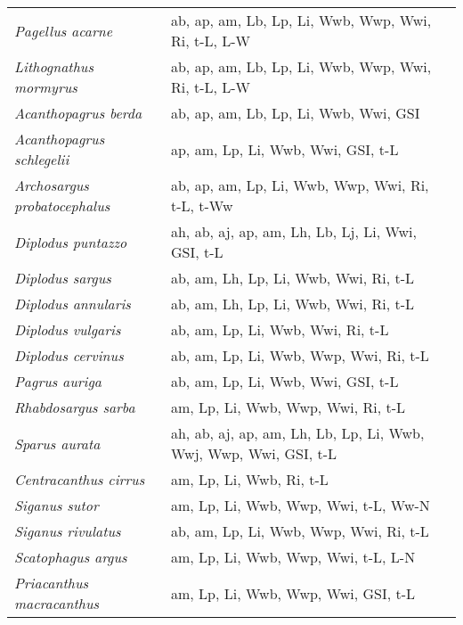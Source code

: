 {\begin{longtable}[c]{p{3.5cm}p{5.5cm}p{5.5cm}}
\emph{Pagellus acarne} &  ab, ap, am, Lb, Lp, Li, Wwb, Wwp, Wwi, Ri, t-L, L-W & \citet{Gaet1935,Bouf2016} \\
\emph{Lithognathus mormyrus} &  ab, ap, am, Lb, Lp, Li, Wwb, Wwp, Wwi, Ri, t-L, L-W & \citet{DivaKent1983,Bouf2016} \\
\emph{Acanthopagrus berda} &  ab, ap, am, Lb, Lp, Li, Wwb, Wwi, GSI & \citet{Garr1993,SheaMolo1999,MathSamu1991,SmitSmit1986,Conn1996,Papa2013} \\
\emph{Acanthopagrus schlegelii} &  ap, am, Lp, Li, Wwb, Wwi, GSI, t-L & \citet{LawSado2018} \\
\emph{Archosargus probatocephalus} &  ab, ap, am, Lp, Li, Wwb, Wwp, Wwi, Ri, t-L, t-Ww & \citet{BeckStan1991} \\
\emph{Diplodus puntazzo} &  ah, ab, aj, ap, am, Lh, Lb, Lj, Li, Wwi, GSI, t-L & \citet{PapaKent2004,LikaKooy2014,Papa2013} \\
\emph{Diplodus sargus} &  ab, am, Lh, Lp, Li, Wwb, Wwi, Ri, t-L & \citet{GordMoli1997} \\
\emph{Diplodus annularis} &  ab, am, Lh, Lp, Li, Wwb, Wwi, Ri, t-L & \citet{GordMoli1997} \\
\emph{Diplodus vulgaris} &  ab, am, Lp, Li, Wwb, Wwi, Ri, t-L & \citet{GordMoli1997} \\
\emph{Diplodus cervinus} &  ab, am, Lp, Li, Wwb, Wwp, Wwi, Ri, t-L & \citet{PajuLore2003} \\
\emph{Pagrus auriga} &  ab, am, Lp, Li, Wwb, Wwi, GSI, t-L & \citet{PajuMart2006,PajuSoco2006} \\
\emph{Rhabdosargus sarba} &  am, Lp, Li, Wwb, Wwp, Wwi, Ri, t-L & \citet{RadeMann2002} \\
\emph{Sparus aurata} &  ah, ab, aj, ap, am, Lh, Lb, Lp, Li, Wwb, Wwj, Wwp, Wwi, GSI, t-L & \citet{LikaKooy2014,Anon2008,KralDulc1997,Papa2013} \\
\emph{Centracanthus cirrus} &  am, Lp, Li, Wwb, Ri, t-L & \citet{OzayBile2000} \\
\emph{Siganus sutor} &  am, Lp, Li, Wwb, Wwp, Wwi, t-L, Ww-N & \citet{MarzJaya2011,NelsLock1992} \\
\emph{Siganus rivulatus} &  ab, am, Lp, Li, Wwb, Wwp, Wwi, Ri, t-L & \citet{MarzJaya2011,BileKaya2002} \\
\emph{Scatophagus argus} &  am, Lp, Li, Wwb, Wwp, Wwi, t-L, L-N & \citet{Gupt2016,Gand1998} \\
\emph{Priacanthus macracanthus} &  am, Lp, Li, Wwb, Wwp, Wwi, GSI, t-L & \citet{LiuHung2001,JounChen1992} \\

\end{longtable}}
